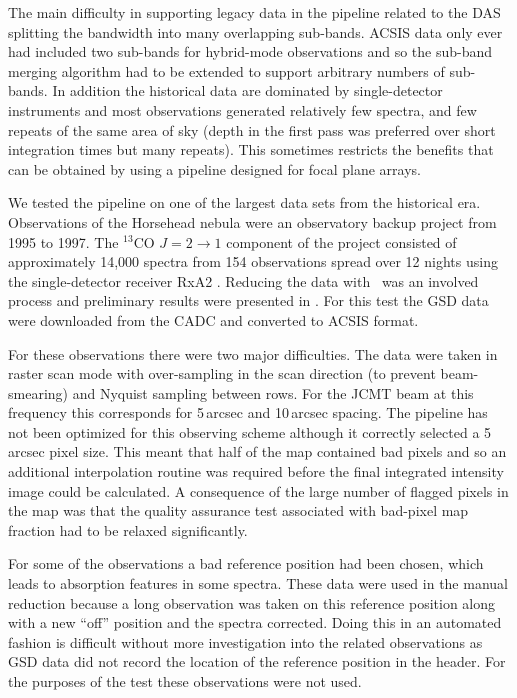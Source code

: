 \documentclass[final,authoryear,5p,times,twocolumn]{elsarticle}
\begin{document}
The main difficulty in supporting legacy data in the pipeline related
to the DAS splitting the bandwidth into many overlapping
sub-bands. ACSIS data only ever had included two sub-bands for hybrid-mode
observations and so the sub-band merging algorithm had to be
extended to support arbitrary numbers of sub-bands.  In addition the
historical data are dominated by single-detector instruments and most
observations generated relatively few spectra, and few repeats of the
same area of sky (depth in the first pass was preferred over short
integration times but many repeats). This sometimes
restricts the benefits that can be obtained by using a pipeline
designed for focal plane arrays.

We tested the pipeline on one of the largest data sets from the
historical era. Observations of the Horsehead nebula were an
observatory backup project from 1995 to 1997. The $^{13}$CO
$J=2\rightarrow 1$ component of the project consisted of approximately
14,000 spectra from 154 observations spread over 12 nights using the
single-detector receiver RxA2 \citep{1992IJIMW..13..647D}. Reducing
the data with \specx\ was an involved process and preliminary results
were presented in \citet{2001AAS...19915601S}. For this test the GSD data were
downloaded from the CADC and converted to ACSIS format.

For these observations there were two major difficulties. The data
were taken in raster scan mode with over-sampling in the scan
direction (to prevent beam-smearing) and Nyquist sampling between
rows. For the JCMT beam at this frequency this corresponds for
5\,arcsec and 10\,arcsec spacing. The pipeline has not been optimized
for this observing scheme although it correctly selected a 5\,arcsec
pixel size. This meant that half of the map contained bad pixels and
so an additional interpolation routine was required before the final
integrated intensity image could be calculated. A consequence of the
large number of flagged pixels in the map was that the quality
assurance test associated with bad-pixel map fraction had to be
relaxed significantly.

For some of the observations a bad reference position had been chosen,
which leads to absorption features in some spectra. These data were
used in the manual reduction because a long observation was taken on
this reference position along with a new ``off'' position and the
spectra corrected. Doing this in an automated fashion is difficult
without more investigation into the related observations as GSD data
did not record the location of the reference position in the
header. For the purposes of the test these observations were not used.
\end{document}
